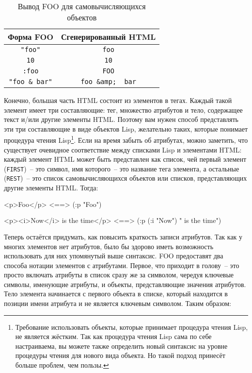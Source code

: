 \begin{table}[tb]
\centering{}
\begin{tabular}{|c|c|}
\hline
  Форма FOO & Сгенерированный HTML \\
\hline
  \lstinline!"foo"! &\lstinline!foo! \\
  \lstinline!10! & \lstinline!10! \\
  \lstinline!:foo! & \lstinline!FOO! \\
  \lstinline!"foo & bar"! & \lstinline!foo &amp;  bar!\\
\hline
\end{tabular}
  \caption{Вывод FOO для самовычисляющихся объектов} 
  \label{table:30-1}
\end{table}

Конечно, большая часть HTML состоит из элементов в тегах. Каждый такой элемент имеет три
составляющие: тег, множество атрибутов и тело, содержащее текст и/или другие элементы
HTML. Поэтому вам нужен способ представлять эти три составляющие в виде объектов Lisp,
желательно таких, которые понимает процедура чтения Lisp\footnote{Требование использовать
  объекты, которые принимает процедура чтения Lisp, не является жёстким. Так как процедура
  чтения Lisp сама по себе настраиваема, вы можете также определить новый синтаксис на
  уровне процедуры чтения для нового вида объекта. Но такой подход принесёт больше
  проблем, чем пользы.}. Если на время забыть об атрибутах, можно заметить, что существует
очевидное соответствие между списками Lisp и элементами HTML: каждый элемент HTML может
быть представлен как список, чей первый элемент (\lstinline{FIRST})~-- это символ, имя
которого~-- это название тега элемента, а остальные (\lstinline{REST})~-- это список
самовычисляющихся объектов или списков, представляющих другие элементы HTML. Тогда:

\begin{myverb}
<p>Foo</p> <==> (:p "Foo")

<p><i>Now</i> is the time</p> <==> (:p (:i "Now") " is the time")
\end{myverb}

Теперь остаётся придумать, как повысить краткость записи атрибутов. Так как у многих
элементов нет атрибутов, было бы здорово иметь возможность использовать для них упомянутый
выше синтаксис. FOO предоставят два способа нотации элементов с атрибутами. Первое, что
приходит в голову~-- это просто включать атрибуты в список сразу же за символом, чередуя
ключевые символы, именующие атрибуты, и объекты, представляющие значения атрибутов. Тело
элемента начинается с первого объекта в списке, который находится в позиции имени атрибута
и не является ключевым символом. Таким образом:

